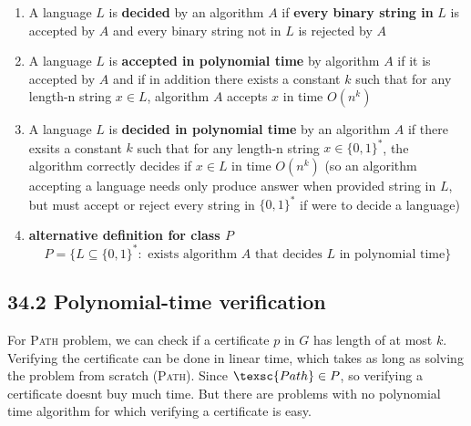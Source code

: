 \documentclass[11pt]{article}
\begin{document}
\begin{defn*}
\begin{enumerate}
        \item A language $L$ is \textbf{decided} by an algorithm $A$ if \textbf{every binary string in} $L$ is accepted by $A$ and every binary string not in $L$ is rejected by $A$
        \item A language $L$ is \textbf{accepted in polynomial time} by algorithm $A$ if it is accepted by $A$ and if in addition there exists a constant $k$ such that for any length-n string $x\in L$, algorithm $A$ accepts $x$ in time $O(n^k)$
        \item A language $L$ is \textbf{decided in polynomial time} by an algorithm $A$ if there exsits a constant $k$ such that for any length-n string $x\in \{ 0,1\}^*$, the algorithm correctly decides if $x\in L$ in time $O(n^k)$ (so an algorithm accepting a language needs only produce answer when provided string in $L$, but must accept or reject every string in $\{0,1 \}^*$ if were to decide a language)
        \item \textbf{alternative definition for class $P$}
        \[
            P = \{L \subseteq \{0,1\}^*: \text{ exists algorithm $A$ that decides $L$ in polynomial time} \}
        \]
    \end{enumerate}
\end{defn*}


\subsection*{34.2 Polynomial-time verification} 


\begin{example}
    For \textsc{Path} problem, we can check if a certificate $p$ in $G$ has length of at most $k$. Verifying the certificate can be done in linear time, which takes as long as solving the problem from scratch (\textsc{Path}). Since $\texsc{Path} \in P$, so verifying a certificate doesnt buy much time. But there are problems with no polynomial time algorithm for which verifying a certificate is easy.
\end{example}
\end{document}

